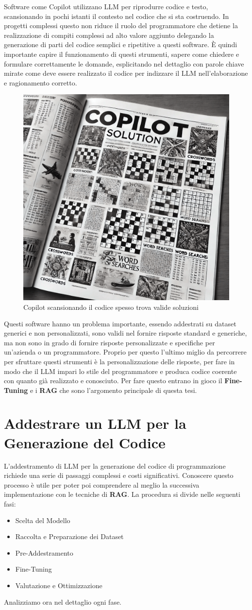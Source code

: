 \documentclass[12pt,a4paper,openright,twoside]{book}
\begin{document}
Software come Copilot utilizzano LLM per riprodurre codice e testo, scansionando in pochi istanti il contesto nel codice che si sta costruendo.
In progetti complessi questo non riduce il ruolo del programmatore che detiene la realizzazione di compiti complessi ad alto valore aggiunto delegando la generazione di parti del codice semplici e ripetitive a questi software.
\`E quindi importante capire il funzionamento di questi strumenti, sapere come chiedere e formulare correttamente le domande, esplicitando nel dettaglio con parole chiave mirate come deve essere realizzato il codice per indizzare il \ac{LLM} nell'elaborazione e ragionamento corretto.
\begin{figure}[h]
    \centering
    \includegraphics[width=0.5\linewidth]{figures/copilotsolutionSettimanaEnigmistica.png}
    \caption{Copilot scansionando il codice spesso trova valide soluzioni}
    \label{fig:Copilot-Solution}
\end{figure}
Questi software hanno un problema importante, essendo addestrati su dataset generici e non personalizzati, sono validi nel fornire risposte standard e generiche, ma non sono in grado di fornire risposte personalizzate e specifiche per un'azienda o un programmatore.
Proprio per questo l'ultimo miglio da percorrere per sfruttare questi strumenti è la personalizzazione delle risposte, per fare in modo che il LLM impari lo stile del programmatore e produca codice coerente con quanto già realizzato e conosciuto.
Per fare questo entrano in gioco il \textbf{Fine-Tuning} e i \textbf{RAG} che sono l'argomento principale di questa tesi.

\chapter{Addestrare un LLM per la Generazione del Codice}

L'addestramento di LLM per la generazione del codice di programmazione richiede una serie di passaggi complessi e costi significativi.
Conoscere questo processo è utile per poter poi comprendere al meglio la successiva implementazione con le tecniche di \textbf{RAG}.
La procedura si divide nelle seguenti fasi:
\begin{itemize}
    \item Scelta del Modello
    \item Raccolta e Preparazione dei Dataset
    \item Pre-Addestramento
    \item Fine-Tuning
    \item Valutazione e Ottimizzazione
\end{itemize}
Analizziamo ora nel dettaglio ogni fase.
\end{document}
